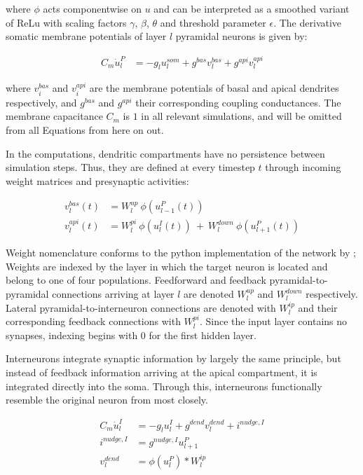where $\phi$ acts componentwise on $u$ and can be interpreted as a smoothed variant of ReLu  with scaling
factors $\gamma$, $\beta$, $\theta$ and threshold parameter $\epsilon$. The derivative somatic membrane potentials of
layer $l$ pyramidal neurons is given by:

\begin{align}
  C_m \dot{u}_l^P & = - g_l u_l^{som} + g^{bas} v_l^{bas} + g^{api} v_l^{api}
\end{align}

where $v_i^{bas}$ and $v_i^{api}$ are the membrane potentials of basal and apical dendrites respectively, and $g^{bas}$
and $g^{api}$ their corresponding coupling conductances. The membrane capacitance $C_m$ is $1$ in all relevant
simulations, and will be omitted from all Equations from here on out.


In the computations, dendritic compartments have no persistence between simulation steps. Thus, they are defined at
every timestep $t$ through incoming weight matrices and presynaptic activities:

\begin{align}
  v_l^{bas}(t) & = W_l^{up} \ \phi(u_{l-1}^P(t))                                     \\
  v_l^{api}(t) & =  W_l^{pi} \ \phi(u_l^I(t)) \ + \  W_l^{down} \ \phi(u_{l+1}^P(t))
\end{align}

Weight nomenclature conforms to the python implementation of the network by \cite{Haider2021}; Weights are indexed by
the layer in which the target neuron is located and belong to one of four populations. Feedforward and feedback
pyramidal-to-pyramidal connections arriving at layer $l$ are denoted $W_l^{up}$ and $W_l^{down}$ respectively. Lateral
pyramidal-to-interneuron connections are denoted with $W_l^{ip}$ and their corresponding feedback connections with
$W_l^{pi}$. Since the input layer contains no synapses, indexing begins with $0$ for the first hidden layer. \newline

Interneurons integrate synaptic information by largely the same principle, but instead of feedback information arriving
at the apical compartment, it is integrated directly into the soma. Through this, interneurons functionally resemble the
original neuron from \cite{urbanczik2014learning} most closely.

\begin{align}
  C_m \dot{u}_l^I & = - g_l u_l^{I} + g^{dend} v_l^{dend} + i^{nudge, I}\label{eq-intn-dynamics} \\
  i^{nudge, I}    & = g^{nudge, I} u_{l+1}^P                                                     \\
  v_l^{dend}      & = \phi(u_{l}^P) * W_l^{ip}
\end{align}

